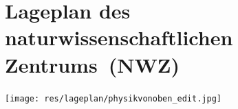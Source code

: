 
\section[Lageplan des naturwiss.\ Zentrums~(NWZ)]{Lageplan des naturwissenschaftlichen Zentrums~(NWZ)}

\texttt{[image: res/lageplan/physikvonoben\_edit.jpg]}

\vspace{3\baselineskip}

